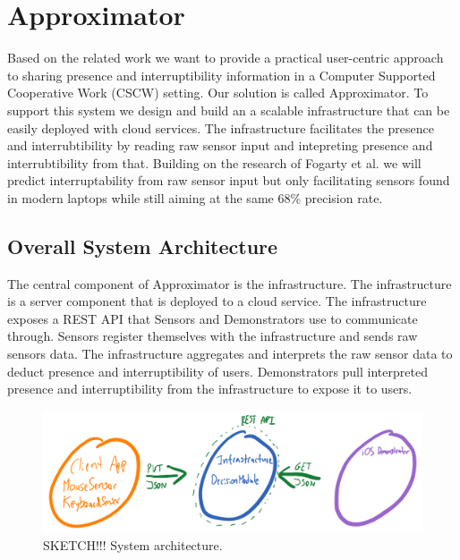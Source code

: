 \documentclass{sigchi}
\begin{document}
\section{Approximator}

Based on the related work we want to provide a practical user-centric approach to sharing presence and interruptibility information in a Computer Supported Cooperative Work (CSCW) setting.
Our solution is called Approximator.
To support this system we design and build an a scalable infrastructure that can be easily deployed with cloud services.
The infrastructure facilitates the presence and interrubtibility by reading raw sensor input and intepreting presence and interrubtibility from that.
Building on the research of Fogarty et al.\cite{fogarty2005predicting} we will predict interruptability from raw sensor input but only facilitating sensors found in modern laptops while still aiming at the same 68\% precision rate.

\subsection{Overall System Architecture}

The central component of Approximator is the infrastructure.
The infrastructure is a server component that is deployed to a cloud service.
The infrastructure exposes a REST API that Sensors and Demonstrators use to communicate through.
Sensors register themselves with the infrastructure and sends raw sensors data.
The infrastructure aggregates and interprets the raw sensor data to deduct presence and interruptibility of users.
Demonstrators pull interpreted presence and interruptibility from the infrastructure to expose it to users.


\begin{figure}[H]
  \centering
  \includegraphics[width=\columnwidth]{figures/architecture.png}
  \caption{SKETCH!!! System architecture.}
  \label{fig:architecture}
\end{figure}

\end{document}
